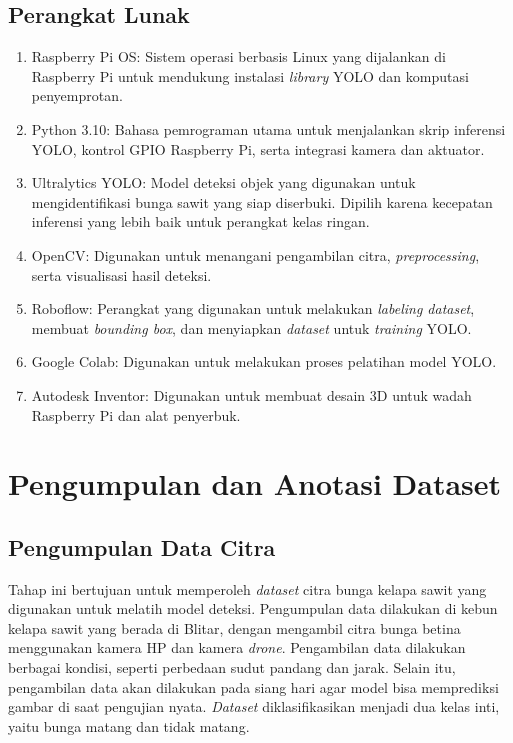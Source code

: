 \subsection{Perangkat Lunak}
\label{subsec:perangkat-lunak}
\begin{enumerate}
  \item Raspberry Pi OS: Sistem operasi berbasis Linux yang dijalankan di Raspberry Pi untuk mendukung instalasi \emph{library} YOLO dan komputasi penyemprotan.
  \item Python 3.10: Bahasa pemrograman utama untuk menjalankan skrip inferensi YOLO, kontrol GPIO Raspberry Pi, serta integrasi kamera dan aktuator.
  \item Ultralytics YOLO: Model deteksi objek yang digunakan untuk mengidentifikasi bunga sawit yang siap diserbuki. Dipilih karena kecepatan inferensi yang lebih baik untuk perangkat kelas ringan.
  \item OpenCV: Digunakan untuk menangani pengambilan citra, \emph{preprocessing}, serta visualisasi hasil deteksi.
  \item Roboflow: Perangkat yang digunakan untuk melakukan \emph{labeling dataset}, membuat \emph{bounding box}, dan menyiapkan \emph{dataset} untuk \emph{training} YOLO.
  \item Google Colab: Digunakan untuk melakukan proses pelatihan model YOLO.
  \item Autodesk Inventor: Digunakan untuk membuat desain 3D untuk wadah Raspberry Pi dan alat penyerbuk.
\end{enumerate}


\section{Pengumpulan dan Anotasi Dataset}
\label{sec:pengumpulan-anotasi-dataset}

\subsection{Pengumpulan Data Citra}
\label{subsec:pengumpulan-data-citra}

Tahap ini bertujuan untuk memperoleh \emph{dataset} citra bunga kelapa sawit yang digunakan untuk melatih model deteksi. Pengumpulan data dilakukan di kebun kelapa sawit yang berada di Blitar, dengan mengambil citra bunga betina menggunakan kamera HP dan kamera \emph{drone}. Pengambilan data dilakukan berbagai kondisi, seperti perbedaan sudut pandang dan jarak. Selain itu, pengambilan data akan dilakukan pada siang hari agar model bisa memprediksi gambar di saat pengujian nyata. \emph{Dataset} diklasifikasikan menjadi dua kelas inti, yaitu bunga matang dan tidak matang.

